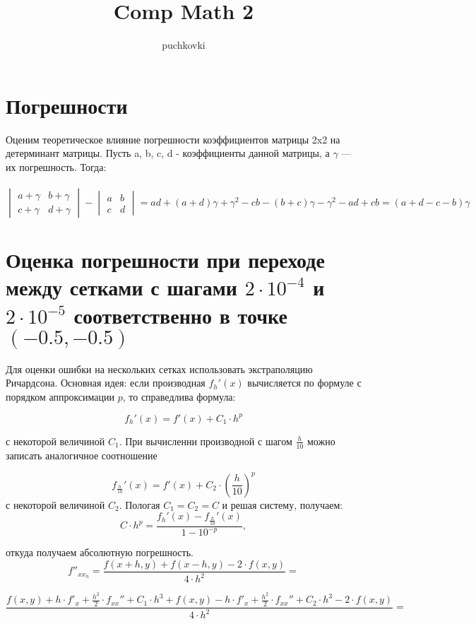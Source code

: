 \documentclass[a4paper, 12pt]{article}
\title{Comp Math 2}
\author{puchkovki}
\begin{document}
\maketitle

\section*{Погрешности}

Оценим теоретическое влияние погрешности коэффициентов матрицы 2x2 на детерминант матрицы. Пусть a, b, c, d - коэффициенты данной матрицы, а $\gamma$ — их погрешность. Тогда: \\
\\
$\begin{vmatrix}
  a+\gamma& b+\gamma\\
  c+\gamma& d+\gamma
\end{vmatrix} -\begin{vmatrix}
  a& b\\
  c& d
\end{vmatrix}  = ad+ (a+d)\gamma + \gamma^2 - cb - (b+c)\gamma - \gamma^2 - ad + cb = (a + d - c - b)\gamma $

\section*{Оценка погрешности при переходе между сетками с шагами $2\cdot10^{-4}$ и $2\cdot10^{-5}$ соответственно в точке $(-0.5, -0.5)$}

Для оценки ошибки на нескольких сетках использовать экстраполяцию Ричардсона. Основная идея: если производная $f_h'(x)$ вычисляется по формуле с порядком аппроксимации $p$, то справедлива формула:

\[f_h'(x) = f'(x) + C_1\cdot h^p\]

с некоторой величиной $C_1$. При вычисленни производной с шагом $\frac{h}{10}$ можно записать аналогичное соотношение

\[f_{\frac{h}{10}}'(x) = f'(x) + C_2\cdot \left(\frac{h}{10}\right)^p\]
с некоторой величиной $C_2$. Пологая $C_1=C_2=C$ и решая систему, получаем:
\[C\cdot h^p = \frac{f_h'(x)-f_{\frac{h}{10}}'(x)}{1-10^{-p}},\]

откуда получаем абсолютную погрешность. 
\[f''_{xx_{h}} = \frac{f(x+h, y) + f(x-h, y) - 2\cdot f(x,y)}{4\cdot h^2} =\]

\[\frac{f(x, y) + h\cdot f'_x+\frac{h^2}{2}\cdot f_{xx}''+ C_1\cdot h^3 + f(x, y) - h\cdot f'_x+\frac{h^2}{2}\cdot f_{xx}''+ C_2\cdot h^3 - 2\cdot f(x,y)}{4\cdot h^2} = \]
\end{document}
